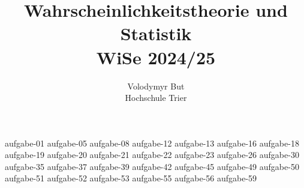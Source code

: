 \documentclass[10pt, oneside]{article}
\title{Wahrscheinlichkeitstheorie und Statistik\\[10pt]\Large{WiSe 2024/25}}
\author{Volodymyr But\\[10pt]Hochschule Trier}
\date{}
\begin{document}
\maketitle
\vspace{25px}

{aufgabe-01}
\pagebreak
{aufgabe-05}
\pagebreak
{aufgabe-08}
\pagebreak
{aufgabe-12}
\pagebreak
{aufgabe-13}
{aufgabe-16}
{aufgabe-18}
\pagebreak
{aufgabe-19}
{aufgabe-20}
{aufgabe-21}
{aufgabe-22}
{aufgabe-23}
{aufgabe-26}
{aufgabe-30}
{aufgabe-35}
{aufgabe-37}
{aufgabe-39}
{aufgabe-42}
\pagebreak
{aufgabe-45}
\pagebreak
{aufgabe-49}
{aufgabe-50}
{aufgabe-51}
\pagebreak
{aufgabe-52}
{aufgabe-53}
{aufgabe-55}
{aufgabe-56}
{aufgabe-59}
\end{document}

